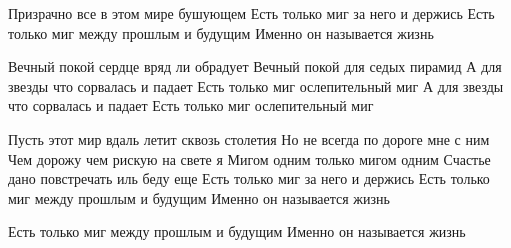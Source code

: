 \raggedcolumns
\begin{multicols}{2} %
\setlength{\parindent}{0pt}
\obeycr
Призрачно все в этом мире бушующем
Есть только миг за него и держись
Есть только миг между прошлым и будущим
Именно он называется жизнь

Вечный покой сердце вряд ли обрадует
Вечный покой для седых пирамид
А для звезды что сорвалась и падает
Есть только миг ослепительный миг
А для звезды что сорвалась и падает
Есть только миг ослепительный миг

Пусть этот мир вдаль летит сквозь столетия
Но не всегда по дороге мне с ним
Чем дорожу чем рискую на свете я
Мигом одним только мигом одним
Счастье дано повстречать иль беду еще
Есть только миг за него и держись
Есть только миг между прошлым и будущим
Именно он называется жизнь

Есть только миг между прошлым и будущим
Именно он называется жизнь
\restorecr
\end{multicols} %

